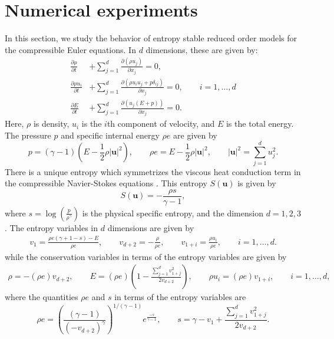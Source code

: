 \documentclass[preprint,10pt]{elsarticle}
\theoremstyle{definition}
\theoremstyle{lemma}
\theoremstyle{theorem}
\theoremstyle{assumption}
\newcommand{\pd}[2]{\frac{\partial#1}{\partial#2}}
\newcommand{\LRp}[1]{\left( #1 \right)}
\newcommand{\LRb}[1]{\left| #1 \right|}
\begin{document}
\section{Numerical experiments}
\label{sec:8}
{In this section, we study the behavior of entropy stable reduced order models for} the compressible Euler equations.  In $d$ dimensions, these are given by:
\begin{align*}
\pd{\rho}{t} &+ {\sum_{j=1}^d \pd{\LRp{\rho {u}_j}}{x_j}} = 0,\\
{\pd{\rho {u}_i}{t}} &+ {\sum_{j=1}^d \pd{\LRp{\rho u_iu_j + p\delta_{ij} }}{x_j}} = 0, \qquad i = 1,\ldots,d\\
\pd{E}{t} &+ {\sum_{j=1}^d \pd{\LRp{{u}_j(E+p)}}{x_j}} = 0.\nonumber
\end{align*}
Here, $\rho$ is density, {$u_i$ is the $i$th component of} velocity, and $E$ is the total energy.  The pressure $p$ and specific internal energy $\rho e$ are given by 
\[
{p = (\gamma-1)\LRp{E - \frac{1}{2}\rho \LRb{\bm{u}}^2}}, \qquad {\rho e = E - \frac{1}{2}\rho\LRb{\bm{u}}^2}, \qquad \LRb{\bm{u}}^2 = {\sum_{j=1}^d u_j^2}.
\]
There is a unique entropy which symmetrizes the viscous heat conduction term in the compressible Navier-Stokes equations \cite{hughes1986new}.  This entropy $S(\bm{u})$ is given by
\begin{equation*}
S(\bm{u}) = -\frac{\rho s}{\gamma-1}, 
\end{equation*}
where $s = \log\LRp{\frac{p}{\rho^\gamma}}$ is the physical specific entropy, and the dimension $d = 1,2,3$.  The entropy variables in $d$ dimensions are given by
\begin{gather*}
v_1 = \frac{\rho e (\gamma + 1 - s) - E}{\rho e}, \qquad v_{d+2} = -\frac{\rho}{\rho e}, \qquad
v_{1+ i}= \frac{\rho {{u}_i}}{\rho e}, \qquad i = 1,\ldots, d.
\end{gather*}
while the conservation variables in terms of the entropy variables are given by
\begin{gather*}
\rho = -(\rho e) v_{d+2}, \qquad E = (\rho e)\LRp{1 - \frac{\sum_{j=1}^d{v_{1+j}^2}}{2 v_{d+2}}}, \qquad
 \rho {u_i} = (\rho e) v_{1+i}, \qquad i = 1,\ldots,d,
\end{gather*}
where the quantities $\rho e$ and $s$ in terms of the entropy variables are 
\begin{equation*}
\rho e = \LRp{\frac{(\gamma-1)}{\LRp{-v_{d+2}}^{\gamma}}}^{1/(\gamma-1)}e^{\frac{-s}{\gamma-1}}, \qquad s = \gamma - v_1 + \frac{\sum_{j=1}^d{v_{1+j}^2}}{2v_{d+2}}.
\end{equation*}
\end{document}
